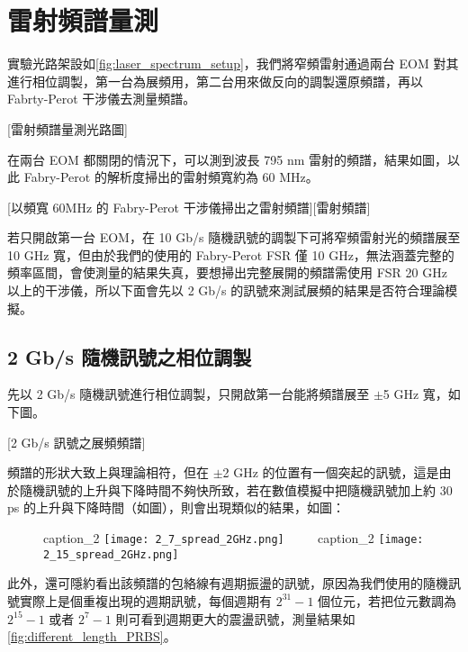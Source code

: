 \documentclass[class=NCU_thesis, crop=false]{standalone}
\begin{document}
\section{雷射頻譜量測}

實驗光路架設如\cref{fig:laser_spectrum_setup}，我們將窄頻雷射通過兩台 EOM 對其進行相位調製，第一台為展頻用，第二台用來做反向的調製還原頻譜，再以 Fabrty-Perot 干涉儀去測量頻譜。

[雷射頻譜量測光路圖]

在兩台 EOM 都關閉的情況下，可以測到波長 795 nm 雷射的頻譜，結果如圖，以此 Fabry-Perot 的解析度掃出的雷射頻寬約為 60 MHz。

[以頻寬 60MHz 的 Fabry-Perot 干涉儀掃出之雷射頻譜][雷射頻譜]

若只開啟第一台 EOM，在 10 Gb/s 隨機訊號的調製下可將窄頻雷射光的頻譜展至 10 GHz 寬，但由於我們的使用的 Fabry-Perot FSR 僅 10 GHz，無法涵蓋完整的頻率區間，會使測量的結果失真，要想掃出完整展開的頻譜需使用 FSR 20 GHz 以上的干涉儀，所以下面會先以 2 Gb/s 的訊號來測試展頻的結果是否符合理論模擬。

\subsection{2 Gb/s 隨機訊號之相位調製}
先以 2 Gb/s 隨機訊號進行相位調製，只開啟第一台能將頻譜展至 $\pm$5 GHz 寬，如下圖。

[2 Gb/s 訊號之展頻頻譜]

頻譜的形狀大致上與理論相符，但在 $\pm$2 GHz 的位置有一個突起的訊號，這是由於隨機訊號的上升與下降時間不夠快所致，若在數值模擬中把隨機訊號加上約 30 ps 的上升與下降時間（如圖），則會出現類似的結果，如圖：

\begin{figure}[!hbt]
    \centering
    \subcaptionbox
        {caption\_2
        \label{fig:subfig_fig1}}
        {\texttt{[image: 2\_7\_spread\_2GHz.png]}}
    ~~~~
    \subcaptionbox
        {caption\_2
        \label{fig:subfig_fig2}}
        {\texttt{[image: 2\_15\_spread\_2GHz.png]}}
\end{figure}


此外，還可隱約看出該頻譜的包絡線有週期振盪的訊號，原因為我們使用的隨機訊號實際上是個重複出現的週期訊號，每個週期有 $2^{31}-1$ 個位元，若把位元數調為 $2^{15}-1$ 或者 $2^{7}-1$ 則可看到週期更大的震盪訊號，測量結果如\cref{fig:different_length_PRBS}。
\end{document}
